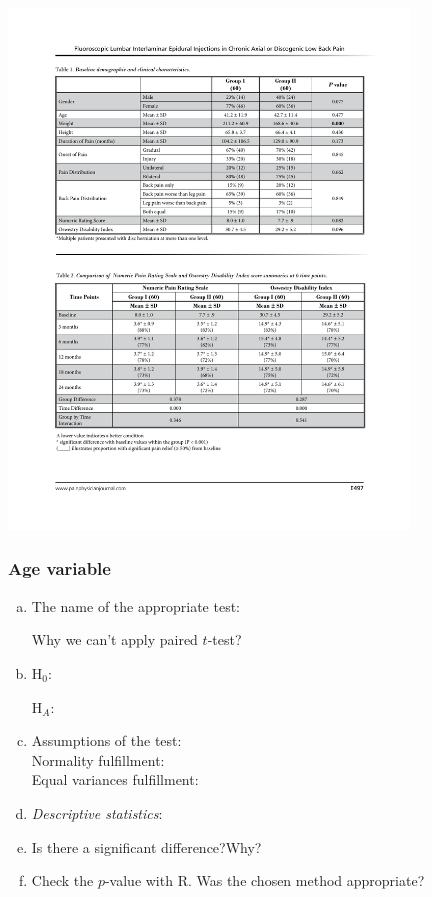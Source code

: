 		\begin{center}
		\includegraphics[trim={1.5cm 15.3cm 1.5cm 3.5cm},clip,width=0.8\textwidth]{Plots/Statisztika-ketmintas-tablak.pdf}
		\end{center}
		
	
	\subsubsection{Age variable}
	
	\begin{enumerate}[a)]
	\item The name of the appropriate test:	\hrulefill
	
		Why we can't apply paired $t$-test? \hrulefill
	\item H$_0$:	\hrulefill

		 H$_A$:	\hrulefill
	\item Assumptions of the test:	\hrulefill
			\\
			Normality fulfillment: \hrulefill
			\\
			Equal variances fulfillment: \hrulefill
			
	\item \emph{Descriptive statistics}: 
		\hrulefill
		
	\item Is there a significant difference?\hrulefill\quad Why? \hrulefill
	
	\item Check the $p$-value with R. Was the chosen method appropriate? \hrulefill
	\end{enumerate}
	
